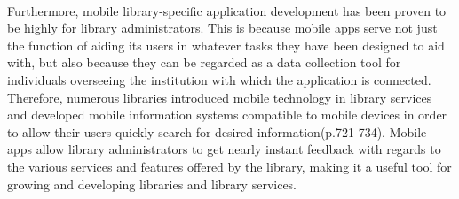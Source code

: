      \paragraph{}
     Furthermore, mobile library-specific application development has been proven to be highly for library administrators. This is because mobile apps serve not just the function of aiding its users in whatever tasks they have been designed to aid with, but also because they can be regarded as a data collection tool for individuals overseeing the institution with which the application is connected. Therefore,  numerous  libraries  introduced  mobile technology in library services and developed mobile information systems compatible to mobile devices in order to allow their users quickly search for desired information(p.721-734). Mobile apps allow library administrators to get nearly instant feedback with regards to the various services and features offered by the library, making it a useful tool for growing and developing libraries and library services. 
    
    
        
        

